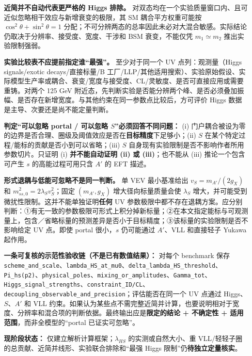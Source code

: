 \documentclass[
]{article}
\begin{document}
\textbf{近简并不自动代表更严格的 Higgs 排除。}
对双态均在一个实验质量窗口内、且可近似忽略相干效应与新增衰变的极限，其
SM 耦合平方权重可能按 \(\cos^2\theta+\sin^2\theta=1\)
分配；不可分辨两态的总率因此未必对大混合敏感。实际结论仍取决于分辨率、接受度、宽度、干涉和
BSM 衰变，不能仅凭 \(m_1\simeq m_2\) 推出实验限制强弱。

\textbf{实验比较表不应提前指定谁``最强''。} 至少对于同一个 UV
点列：观测量（Higgs signals/exotic decays/直接标量/B
工厂/LLP/其他适用搜索）、实验原始假设、实际模型生产率或耦合、衰变/宽度与接受度、CL/灵敏度、是否可直接应用或需要重铸。对两个
125 GeV
附近态，先判断实验是否能分辨两个峰、是否必须叠加振幅、是否存在新增宽度。与其他约束在同一参数点比较后，方可评价
Higgs 数据是主导、次要还是尚不能定量判断。

\textbf{判定``可以忽略 portal / 可以忽略 \(S\)''必须回答不同问题：} (i)
门户耦合被设为零的边界是否合理、圈级及阈值效应是否在\textbf{目标精度}下足够小；(ii)
\(S\) 在某个特定过程/能标的贡献是否小到可以省略；(iii) \(S\)
自身现有实验限制是否不影响作者所用参数切片。只证明 (i)
\textbf{并不能自动证明 (ii) 或 (iii)}；也不能从 (iii) 推论一个包含可产生
\(s\) 的高能过程可用只含 \(A'\) 的 EFT 描述。

\textbf{形式退耦与低能可忽略不是同一判断。} 单 VEV 最小基准给出
\(v_S=m_{A'}/(2g_X)\) 和 \(m_{ss,0}^2=2\lambda_Sv_S^2\)；固定
\((m_{A'},g_X)\) 增大径向标量质量会使 \(\lambda_S\)
增大，并可能受到微扰性限制。这并不能单独证明\textbf{任何} UV
参数极限中都不存在退耦方案。应分别判断：①有无一致的参数极限可形式上积分掉新标量；②在本文指定能标与可观测量上，包含／省略标量的预测差异是否小于目标精度；③该标量的实验限制是否不影响给定
UV 点。即使 portal 很小，\(s\) 仍可能通过 \(A'\)、VLL 和直接轻子 Yukawa
起作用。

\textbf{一条可复核的示范性验收链（不是已有数值结果）：} 对每个 benchmark
保存
\texttt{scheme\_and\_scale}、\texttt{lambda\_HS\_at\_mu0}、\texttt{delta\_lambda\_HS\_threshold}、\texttt{Pi\_hs(p2)}、\texttt{physical\_poles}、\texttt{mixing\_or\_amplitudes}、\texttt{Gamma\_tot}、\texttt{Higgs\_signal\_strengths}、\texttt{constraint\_ID/CL}、\texttt{decoupling\_observable\_and\_precision}；评估能否在同一个
UV 点通过 Higgs、\(S\)、\(A'\) 和 VLL
约束。如果认为某些点不需完整近简并计算，也要说明相对于宽度、分辨率和混合项的判断依据。最终输出应是\textbf{限定的结论
+ 不确定性 + 适用范围}，而非全模型的``portal 已证实可忽略''。

\textbf{现阶段状态：} 仅建立解析计算框架；\(\lambda_{HS}\)
的实测或自然大小、重
VLL/轻轻子圈的总贡献、近简并线形、实验联合排除和``最强 Higgs
限制''仍\textbf{待独立定量核实}。
\end{document}
